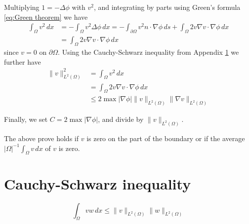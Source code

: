 \documentclass[acmsmall,screen]{MapleTrans}
\begin{document}
Multiplying $1 = -\Delta\phi$ with $v^2$, and integrating by parts using Green's formula \eqref{eq:Green theorem} we have
\begin{equation}
\begin{aligned}
    \int_\Omega v^2 \, dx &= -\int_\Omega v^2 \Delta\phi \, dx
    = - \int_{\partial\Omega}v^2 n \cdot \nabla\phi \, ds + \int_\Omega 2v\nabla v \cdot \nabla\phi \, dx \\
    &= \int_\Omega 2v\nabla v \cdot \nabla\phi \, dx
\end{aligned}
\end{equation}
since $v = 0$ on $\partial\Omega$. Using the Cauchy-Schwarz inequality from Appendix \ref{sec:Cauchy-Schwarz inequality} we further have
\begin{equation}
\begin{aligned}
    \|v\|_{L^2(\Omega)}^2 &= \int_\Omega v^2 \, dx \\
    &= \int_\Omega 2v\nabla v \cdot \nabla\phi \, dx \\
    &\leq 2\max |\nabla\phi| \|v\|_{L^2(\Omega)} \|\nabla v\|_{L^2(\Omega)}
\end{aligned}
\end{equation}

Finally, we set $C = 2\max |\nabla\phi|$, and divide by $\|v\|_{L^2(\Omega)}$.

The above prove holds if $v$ is zero on the part of the boundary or if the average $|\Omega|^{-1}\int_\Omega v \, dx$ of $v$ is zero.

\section{Cauchy-Schwarz inequality} \label{sec:Cauchy-Schwarz inequality}
\begin{equation}
    \int_\Omega vw \, dx \leq \|v\|_{L^2(\Omega)} \|w\|_{L^2(\Omega)}
\end{equation}
\end{document}
